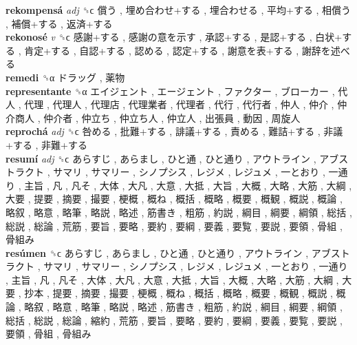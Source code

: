 \textbf{rekompensá} \emph{adj}  ␝ϲ   償う ,  埋め合わせ+する ,  埋合わせる ,  平均+する ,  相償う ,  補償+する ,  返済+する   \\
\textbf{rekonosé} \emph{v}  ␝ϲ   感謝+する ,  感謝の意を示す ,  承認+する ,  是認+する ,  白状+する ,  肯定+する ,  自認+する ,  認める ,  認定+する ,  謝意を表+する ,  謝辞を述べる   \\
\textbf{remedi} ␝α   ドラッグ ,  薬物   \\
\textbf{representante} ␝α   エイジェント ,  エージェント ,  ファクター ,  ブローカー ,  代人 ,  代理 ,  代理人 ,  代理店 ,  代理業者 ,  代理者 ,  代行 ,  代行者 ,  仲人 ,  仲介 ,  仲介商人 ,  仲介者 ,  仲立ち ,  仲立ち人 ,  仲立人 ,  出張員 ,  動因 ,  周旋人   \\
\textbf{reprochá} \emph{adj}  ␝ϲ   咎める ,  批難+する ,  誹議+する ,  責める ,  難詰+する ,  非議+する ,  非難+する   \\
\textbf{resumí} \emph{adj}  ␝ϲ   あらすじ ,  あらまし ,  ひと通 ,  ひと通り ,  アウトライン ,  アブストラクト ,  サマリ ,  サマリー ,  シノプシス ,  レジメ ,  レジュメ ,  一とおり ,  一通り ,  主旨 ,  凡 ,  凡そ ,  大体 ,  大凡 ,  大意 ,  大抵 ,  大旨 ,  大概 ,  大略 ,  大筋 ,  大綱 ,  大要 ,  提要 ,  摘要 ,  撮要 ,  梗概 ,  概ね ,  概括 ,  概略 ,  概要 ,  概観 ,  概説 ,  概論 ,  略叙 ,  略意 ,  略筆 ,  略説 ,  略述 ,  筋書き ,  粗筋 ,  約説 ,  綱目 ,  綱要 ,  綱領 ,  総括 ,  総説 ,  総論 ,  荒筋 ,  要旨 ,  要略 ,  要約 ,  要綱 ,  要義 ,  要覧 ,  要説 ,  要領 ,  骨組 ,  骨組み   \\
\textbf{resúmen} ␝ϲ   あらすじ ,  あらまし ,  ひと通 ,  ひと通り ,  アウトライン ,  アブストラクト ,  サマリ ,  サマリー ,  シノプシス ,  レジメ ,  レジュメ ,  一とおり ,  一通り ,  主旨 ,  凡 ,  凡そ ,  大体 ,  大凡 ,  大意 ,  大抵 ,  大旨 ,  大概 ,  大略 ,  大筋 ,  大綱 ,  大要 ,  抄本 ,  提要 ,  摘要 ,  撮要 ,  梗概 ,  概ね ,  概括 ,  概略 ,  概要 ,  概観 ,  概説 ,  概論 ,  略叙 ,  略意 ,  略筆 ,  略説 ,  略述 ,  筋書き ,  粗筋 ,  約説 ,  綱目 ,  綱要 ,  綱領 ,  総括 ,  総説 ,  総論 ,  縮約 ,  荒筋 ,  要旨 ,  要略 ,  要約 ,  要綱 ,  要義 ,  要覧 ,  要説 ,  要領 ,  骨組 ,  骨組み   \\
